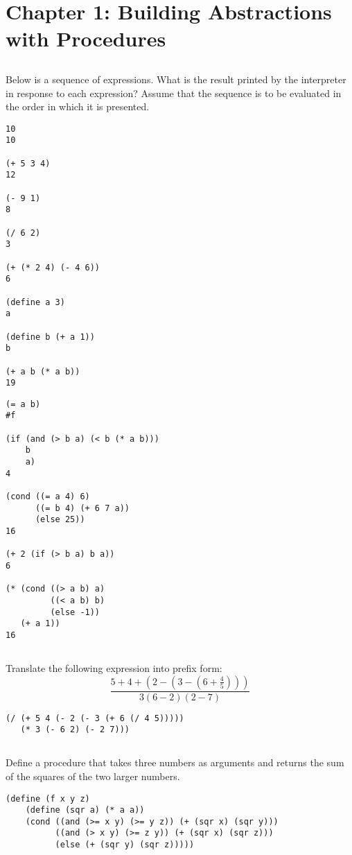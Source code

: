 \documentclass{article}
\begin{document}
\section{Chapter 1: Building Abstractions with Procedures}

\subsection{}
Below is a sequence of expressions. What is the result printed by the interpreter in response to each expression? Assume that the sequence is to be evaluated in the order in which it is presented.
\begin{multicols}{2}
\begin{lstlisting}
10
10

(+ 5 3 4)
12
    
(- 9 1)
8

(/ 6 2)
3

(+ (* 2 4) (- 4 6))
6

(define a 3)
a

(define b (+ a 1))
b

(+ a b (* a b))
19
\end{lstlisting}
\columnbreak
\begin{lstlisting}
(= a b)
#f

(if (and (> b a) (< b (* a b)))
    b
    a)
4

(cond ((= a 4) 6)
      ((= b 4) (+ 6 7 a))
      (else 25))
16

(+ 2 (if (> b a) b a))
6

(* (cond ((> a b) a)
         ((< a b) b)
         (else -1))
   (+ a 1))
16
\end{lstlisting}
\end{multicols}

\subsection{}
Translate the following expression into prefix form:\\
\[ \frac{5 + 4 + (2 - (3 - (6 + \frac{4}{5})))}{3(6 - 2)(2 - 7)} \]
\begin{lstlisting}
(/ (+ 5 4 (- 2 (- 3 (+ 6 (/ 4 5)))))
   (* 3 (- 6 2) (- 2 7)))
\end{lstlisting}

\subsection{}
Define a procedure that takes three numbers as arguments and returns the sum of the squares of the two larger numbers.
\begin{lstlisting}
(define (f x y z)
    (define (sqr a) (* a a))
    (cond ((and (>= x y) (>= y z)) (+ (sqr x) (sqr y)))
          ((and (> x y) (>= z y)) (+ (sqr x) (sqr z)))
          (else (+ (sqr y) (sqr z)))))
\end{lstlisting}
\end{document}
